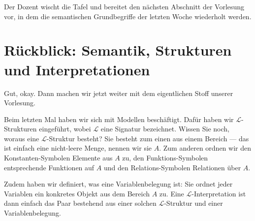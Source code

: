 \begin{ai-global-state-checkpoint-invisible-content}
\end{ai-global-state-checkpoint-invisible-content}

\begin{lecture-break}
Der Dozent wischt die Tafel und bereitet den nächsten Abschnitt der Vorlesung vor, in dem die semantischen Grundbegriffe der letzten Woche wiederholt werden.
\end{lecture-break}

\section{Rückblick: Semantik, Strukturen und Interpretationen}

\begin{spoken-clean}[00:06:48 - 00:07:47]
Gut, okay. Dann machen wir jetzt weiter mit dem eigentlichen Stoff unserer Vorlesung.

Beim letzten Mal haben wir sich mit Modellen beschäftigt. Dafür haben wir $\mathcal{L}$-Strukturen eingeführt, wobei $\mathcal{L}$ eine Signatur bezeichnet. Wissen Sie noch, woraus eine $\mathcal{L}$-Struktur besteht? Sie besteht zum einen aus einem Bereich --- das ist einfach eine nicht-leere Menge, nennen wir sie $A$. Zum anderen ordnen wir den Konstanten-Symbolen Elemente aus $A$ zu, den Funktions-Symbolen entsprechende Funktionen auf $A$ und den Relations-Symbolen Relationen über $A$.

Zudem haben wir definiert, was eine Variablenbelegung ist: Sie ordnet jeder Variablen ein konkretes Objekt aus dem Bereich $A$ zu. Eine $\mathcal{L}$-Interpretation ist dann einfach das Paar bestehend aus einer solchen $\mathcal{L}$-Struktur und einer Variablenbelegung.
\end{spoken-clean}

